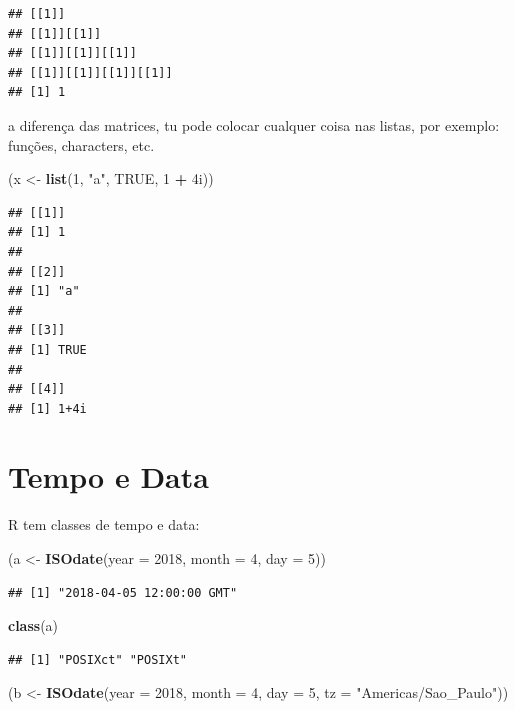 \documentclass[]{book}
\newenvironment{Shaded}{\begin{snugshade}}{\end{snugshade}}
\newcommand{\KeywordTok}[1]{\textcolor[rgb]{0.13,0.29,0.53}{\textbf{#1}}}
\newcommand{\DataTypeTok}[1]{\textcolor[rgb]{0.13,0.29,0.53}{#1}}
\newcommand{\DecValTok}[1]{\textcolor[rgb]{0.00,0.00,0.81}{#1}}
\newcommand{\StringTok}[1]{\textcolor[rgb]{0.31,0.60,0.02}{#1}}
\newcommand{\OtherTok}[1]{\textcolor[rgb]{0.56,0.35,0.01}{#1}}
\newcommand{\OperatorTok}[1]{\textcolor[rgb]{0.81,0.36,0.00}{\textbf{#1}}}
\newcommand{\NormalTok}[1]{#1}
\theoremstyle{definition}
\theoremstyle{definition}
\theoremstyle{definition}
\theoremstyle{remark}
\begin{document}
\begin{verbatim}
## [[1]]
## [[1]][[1]]
## [[1]][[1]][[1]]
## [[1]][[1]][[1]][[1]]
## [1] 1
\end{verbatim}

a diferença das matrices, tu pode colocar cualquer coisa nas listas, por
exemplo: funções, characters, etc.

\begin{Shaded}
\begin{Highlighting}[]
\NormalTok{(x <-}\StringTok{ }\KeywordTok{list}\NormalTok{(}\DecValTok{1}\NormalTok{, }\StringTok{"a"}\NormalTok{, }\OtherTok{TRUE}\NormalTok{, }\DecValTok{1} \OperatorTok{+}\StringTok{ }\NormalTok{4i))}
\end{Highlighting}
\end{Shaded}

\begin{verbatim}
## [[1]]
## [1] 1
## 
## [[2]]
## [1] "a"
## 
## [[3]]
## [1] TRUE
## 
## [[4]]
## [1] 1+4i
\end{verbatim}

\section{Tempo e Data}\label{tempo-e-data}

R tem classes de tempo e data:

\begin{Shaded}
\begin{Highlighting}[]
\NormalTok{(a <-}\StringTok{ }\KeywordTok{ISOdate}\NormalTok{(}\DataTypeTok{year =} \DecValTok{2018}\NormalTok{, }\DataTypeTok{month =} \DecValTok{4}\NormalTok{, }\DataTypeTok{day =} \DecValTok{5}\NormalTok{))}
\end{Highlighting}
\end{Shaded}

\begin{verbatim}
## [1] "2018-04-05 12:00:00 GMT"
\end{verbatim}

\begin{Shaded}
\begin{Highlighting}[]
\KeywordTok{class}\NormalTok{(a)}
\end{Highlighting}
\end{Shaded}

\begin{verbatim}
## [1] "POSIXct" "POSIXt"
\end{verbatim}

\begin{Shaded}
\begin{Highlighting}[]
\NormalTok{(b <-}\StringTok{ }\KeywordTok{ISOdate}\NormalTok{(}\DataTypeTok{year =} \DecValTok{2018}\NormalTok{, }\DataTypeTok{month =} \DecValTok{4}\NormalTok{, }\DataTypeTok{day =} \DecValTok{5}\NormalTok{, }\DataTypeTok{tz =} \StringTok{"Americas/Sao_Paulo"}\NormalTok{))}
\end{Highlighting}
\end{Shaded}
\end{document}
